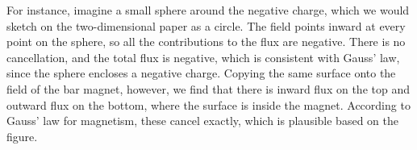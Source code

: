 For instance, imagine a small sphere around the negative charge,
which we would sketch on the two-dimensional paper as a circle. The field points
inward at every point on the sphere, so all the contributions to the flux are negative.
There is no cancellation, and the total flux is negative, which is consistent with
Gauss' law, since the sphere encloses a negative charge. Copying the same surface onto
the field of the bar magnet, however, we find that there is inward flux on the top
and outward flux on the bottom, where the surface is inside the magnet. According to
Gauss' law for magnetism, these cancel exactly, which is plausible based on the figure.
